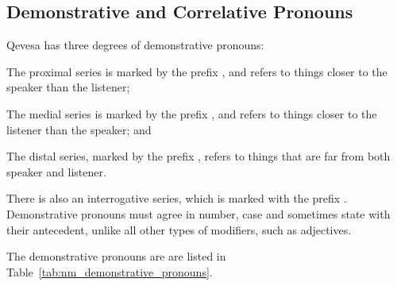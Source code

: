 \documentclass[grammar]{subfiles}
\begin{document}

  \subsection{Demonstrative and Correlative Pronouns}
  \label{ssec:nm_demonstrative_pronouns}

  Qevesa has three degrees of demonstrative pronouns:

  \begin{description}[style=nextline]
    \item[Proximal] The proximal series is marked by the prefix ,
      and refers to things closer to the speaker than the listener;
    \item[Medial] The medial series is marked by the prefix , and
      refers to things closer to the listener than the speaker; and
    \item[Distal] The distal series, marked by the prefix , refers
      to things that are far from both speaker and listener.
  \end{description}

  There is also an interrogative series, which is marked with the prefix
  .  Demonstrative pronouns must agree in number, case and
  sometimes state with their antecedent, unlike all other types of modifiers,
  such as adjectives. 


  The demonstrative pronouns are are listed in Table~\ref{tab:nm_demonstrative_pronouns}.
\end{document}
